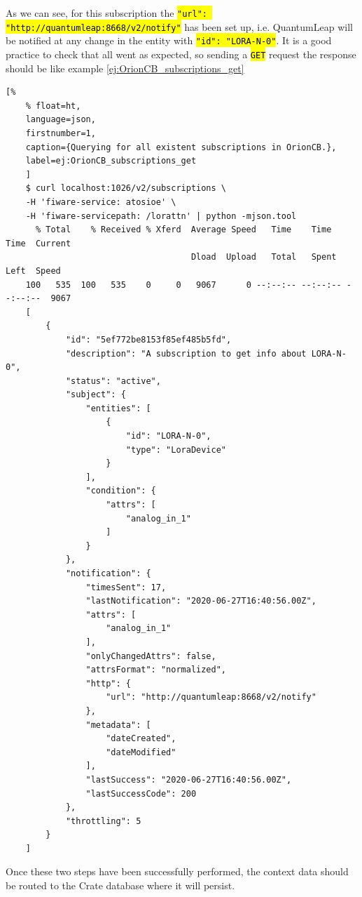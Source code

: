 \documentclass[11pt,a4paper,dvipsnames,twoside]{article}
\newcommand{\cmd}[1] {\hl{\texttt{#1}}}
\begin{document}
\begin{itemize}
  As we can see, for this subscription the \cmd{"url": "http://quantumleap:8668/v2/notify"} has been set up, i.e. QuantumLeap will be notified at any change in the entity with \cmd{"id": "LORA-N-0"}. It is a good practice to check that all went as expected, so sending a \cmd{GET} request the response should be like example \ref{ej:OrionCB_subscriptions_get} 

  \begin{lstlisting}[%
    % float=ht,
    language=json,
    firstnumber=1,
    caption={Querying for all existent subscriptions in OrionCB.},
    label=ej:OrionCB_subscriptions_get
    ]
    $ curl localhost:1026/v2/subscriptions \
    -H 'fiware-service: atosioe' \
    -H 'fiware-servicepath: /lorattn' | python -mjson.tool
      % Total    % Received % Xferd  Average Speed   Time    Time     Time  Current
                                     Dload  Upload   Total   Spent    Left  Speed
    100   535  100   535    0     0   9067      0 --:--:-- --:--:-- --:--:--  9067
    [
        {
            "id": "5ef772be8153f85ef485b5fd",
            "description": "A subscription to get info about LORA-N-0",
            "status": "active",
            "subject": {
                "entities": [
                    {
                        "id": "LORA-N-0",
                        "type": "LoraDevice"
                    }
                ],
                "condition": {
                    "attrs": [
                        "analog_in_1"
                    ]
                }
            },
            "notification": {
                "timesSent": 17,
                "lastNotification": "2020-06-27T16:40:56.00Z",
                "attrs": [
                    "analog_in_1"
                ],
                "onlyChangedAttrs": false,
                "attrsFormat": "normalized",
                "http": {
                    "url": "http://quantumleap:8668/v2/notify"
                },
                "metadata": [
                    "dateCreated",
                    "dateModified"
                ],
                "lastSuccess": "2020-06-27T16:40:56.00Z",
                "lastSuccessCode": 200
            },
            "throttling": 5
        }
    ]

  \end{lstlisting}

\end{itemize}

Once these two steps have been successfully performed, the context data should be routed to the Crate database where it will persist. 
\end{document}
